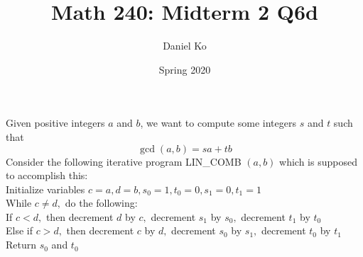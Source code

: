 \documentclass[11pt]{scrartcl}
\title{Math 240: Midterm 2 Q6d}
\author{Daniel Ko}
\date{Spring 2020}
\begin{document}
\maketitle

Given positive integers $a$ and $b$, we want to compute some integers $s$ and $t$ such that
\[\operatorname{gcd}(a, b)=s a+t b\]
Consider the following iterative program LIN\_COMB $(a, b)$ which is supposed to accomplish this:\\
\hspace*{10mm}Initialize variables $c=a, d=b, s_{0}=1, t_{0}=0, s_{1}=0, t_{1}=1$\\
\hspace*{10mm}While $c \neq d,$ do the following:\\
\hspace*{20mm}If $c<d,$ then decrement $d$ by $c,$ decrement $s_{1}$ by $s_{0},$ decrement $t_{1}$ by $t_{0}$\\
\hspace*{20mm}Else if $c>d,$ then decrement $c$ by $d,$ decrement $s_{0}$ by $s_{1},$ decrement $t_{0}$ by $t_{1}$\\
\hspace*{10mm}Return $s_{0}$ and $t_{0}$\\
\end{document}

